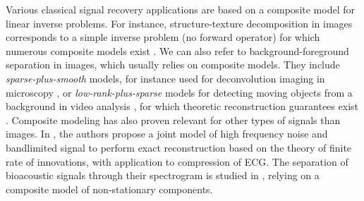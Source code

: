 \documentclass[12pt]{article}
\begin{document}
    Various classical signal recovery applications are based on a composite model for linear inverse problems.
    For instance, structure-texture decomposition in images corresponds to a simple inverse problem (no forward operator) for which numerous composite models exist \cite{aujol2006std,guennec2024std}.
    We can also refer to background-foreground separation in images, which usually relies on composite models. They include \emph{sparse-plus-smooth} models, for instance used for deconvolution imaging in microscopy \cite{debarnot2020learning,stergiopoulou2022colorme}, or \emph{low-rank-plus-sparse} models for detecting moving objects from a background in video analysis \cite{bouwmans2017decomposition}, for which theoretic reconstruction guarantees exist \cite{tanner2023composite}.
    Composite modeling has also proven relevant for other types of signals than images. In \cite{marziliano2006blsignals}, the authors propose a joint model of high frequency noise and bandlimited signal to perform exact reconstruction based on the theory of finite rate of innovations, with application to compression of ECG.
    The separation of bioacoustic signals through their spectrogram is studied in \cite{kreme2024separation}, relying on a composite model of non-stationary components.
\end{document}
